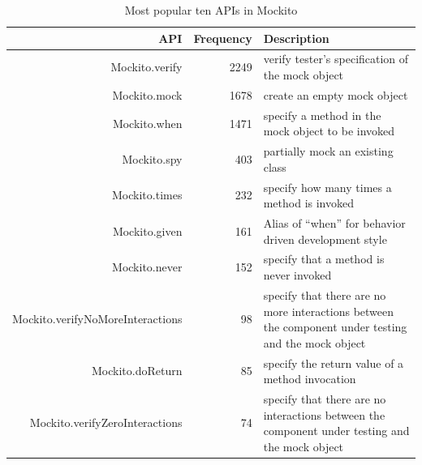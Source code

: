 \begin{table}
\caption{Most popular ten APIs in Mockito}
\vspace{-0.15cm}
\label{table:mockito}
\centering
\begin{tabular}{|r|r|p{1.3in}|}
\hline
API & Frequency & Description\\
\hline
Mockito.verify&2249 & verify tester's specification of the mock object\\
Mockito.mock&1678 & create an empty mock object\\
Mockito.when&1471 & specify a method in the mock object to be invoked\\
Mockito.spy&403      & partially mock an existing class\\
Mockito.times&232   & specify how many times a method is invoked\\
Mockito.given&161   & Alias of ``when'' for behavior driven development style\\
Mockito.never&152  & specify that a method is never invoked\\
Mockito.verifyNoMoreInteractions & 98 & specify that there are no more interactions between the component under testing and the mock object\\ 
Mockito.doReturn & 85 & specify the return value of a method invocation\\
Mockito.verifyZeroInteractions & 74 & specify that there are no interactions between the component under testing and the mock object\\ 
\hline
\end{tabular}
\vspace{-0.15cm}
\end{table}

